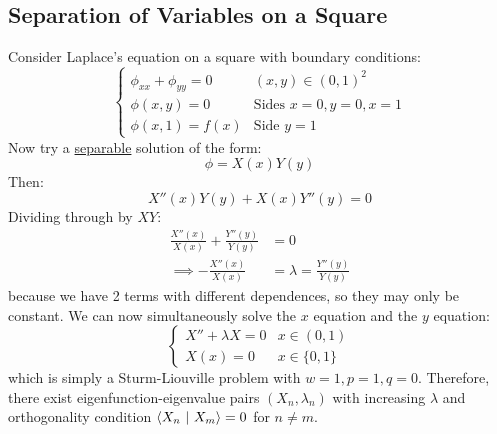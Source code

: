 \documentclass[../Main.tex]{subfiles}
\begin{document}
\subsection{Separation of Variables on a Square}
Consider Laplace's equation on a square with boundary conditions:
\begin{equation*}
    \begin{cases}
        \phi_{xx} + \phi_{yy} = 0 & (x, y) \in (0, 1)^2 \\
        \phi(x, y) = 0 & \text{Sides } x = 0, y = 0, x = 1 \\
        \phi(x, 1) = f(x) & \text{Side }y = 1
    \end{cases}
\end{equation*}
Now try a \underline{separable} solution of the form:
\begin{equation*}
    \phi = X(x) Y(y)
\end{equation*}
Then:
\begin{equation*}
    X''(x) Y(y) + X(x)Y''(y) = 0
\end{equation*}
Dividing through by $XY$:
\begin{align*}
    \frac{X''(x)}{X(x)} + \frac{Y''(y)}{Y(y)} &= 0 \\
    \implies -\frac{X''(x)}{X(x)} &= \lambda = \frac{Y''(y)}{Y(y)}
\end{align*}
because we have 2 terms with different dependences, so they may only be constant. We can now simultaneously solve the $x$ equation and the $y$ equation:
\begin{equation*}
    \begin{cases}
        X'' + \lambda X = 0 & x \in (0,1) \\
        X(x) = 0 & x \in \{0, 1\}
    \end{cases}
\end{equation*}
which is simply a Sturm-Liouville problem with $w = 1, p = 1, q = 0$. Therefore, there exist eigenfunction-eigenvalue pairs $(X_n, \lambda_n)$ with increasing $\lambda$ and orthogonality condition $\langle X_n~\vert~X_m\rangle = 0$ for $n \neq m$.
\end{document}
